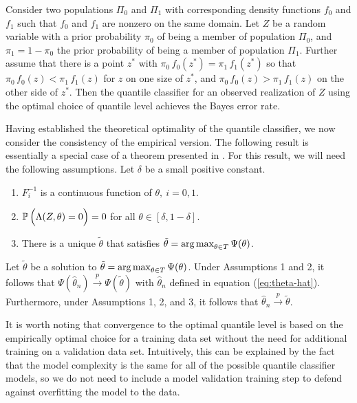 \begin{lemma}
  \label{thm:quantile-classifier-is-bayes}
  Consider two populations $\Pi_0$ and $\Pi_1$ with corresponding density
  functions $f_0$ and $f_1$ such that $f_0$ and $f_1$ are nonzero on the same
  domain.  Let $Z$ be a random variable with a prior probability $\pi_0$ of
  being a member of population $\Pi_0$, and $\pi_1 = 1 - \pi_0$ the prior
  probability of being a member of population $\Pi_1$.  Further assume that
  there is a point $z^{*}$ with $\pi_0\, f_0(z^{*}) = \pi_1\, f_1(z^{*})$ so
  that $\pi_0\, f_0(z) < \pi_1\, f_1(z)$ for $z$ on one size of $z^{*}$, and
  $\pi_0\, f_0(z) > \pi_1\, f_1(z)$ on the other side of $z^{*}$.  Then the
  quantile classifier for an observed realization of $Z$ using the optimal
  choice of quantile level achieves the Bayes error rate.
\end{lemma}

Having established the theoretical optimality of the quantile classifier, we now
consider the consistency of the empirical version.  The following result is
essentially a special case of a theorem presented in \cite{hennig2016}.  For
this result, we will need the following assumptions.  Let $\delta$ be a small
positive constant.
\begin{enumerate}[label=\emph{Assumption \arabic*.}, align=left]
\item $F_i^{-1}$ is a continuous function of
  $\theta,~ i=0,1$.
\item $\mathbb{P}\,\Big( \Lambda(Z, \theta) = 0 \Big) = 0$ for all
  $\theta \in [\delta, 1 - \delta]$.
\item There is a unique $\tilde{\theta}$ that satisfies $\tilde{\theta} =
  \operatorname*{arg\,max}_{\theta \in T} \Psi(\theta)$.
\end{enumerate}

\begin{lemma}
  \label{lem:univariate-consistency}
  Let $\tilde{\theta}$ be a solution to
  $\tilde{\theta} = \operatorname*{arg\,max}_{\theta \in T} \Psi(\theta)$.  Under Assumptions 1
  and 2, it follows that
  $\Psi(\hat{\theta}_n) \stackrel{p}{\longrightarrow} \Psi(\tilde{\theta})$ with
  $\hat{\theta}_n$ defined in equation (\ref{eq:theta-hat}).  Furthermore, under
  Assumptions 1, 2, and 3, it follows that
  $\hat{\theta}_n \stackrel{p}{\longrightarrow} \tilde{\theta}$.
\end{lemma}

It is worth noting that convergence to the optimal quantile level is based on
the empirically optimal choice for a training data set without the need for
additional training on a validation data set.  Intuitively, this can be
explained by the fact that the model complexity is the same for all of the
possible quantile classifier models, so we do not need to include a model
validation training step to defend against overfitting the model to the data.




